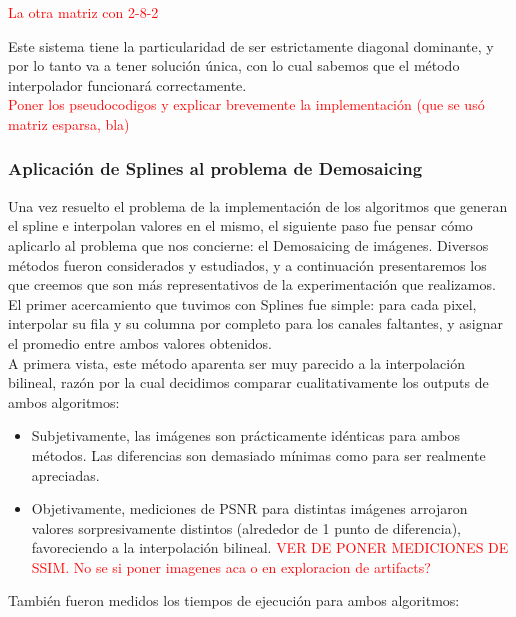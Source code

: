 \documentclass[a4paper]{article}
\begin{document}
\textcolor{red}{La otra matriz con 2-8-2\\}

Este sistema tiene la particularidad de ser estrictamente diagonal dominante, y por lo tanto va a tener solución única, con lo cual sabemos que el método interpolador funcionará correctamente. \\


\textcolor{red}{Poner los pseudocodigos y explicar brevemente la implementación (que se usó matriz esparsa, bla)\\}


\subsubsection*{Aplicación de Splines al problema de Demosaicing}

Una vez resuelto el problema de la implementación de los algoritmos que generan el spline e interpolan valores en el mismo, el siguiente paso fue pensar c\'omo aplicarlo al problema que nos concierne: el Demosaicing de imágenes. Diversos métodos fueron considerados y estudiados, y a continuación presentaremos los que creemos que son más representativos de la experimentación que realizamos. \\

El primer acercamiento que tuvimos con Splines fue simple: para cada pixel, interpolar su fila y su columna por completo para los canales faltantes, y asignar el promedio entre ambos valores obtenidos. \\
A primera vista, este método aparenta ser muy parecido a la interpolación bilineal, razón por la cual decidimos comparar cualitativamente los outputs de ambos algoritmos:
\begin{itemize}
\item Subjetivamente, las imágenes son prácticamente idénticas para ambos métodos. Las diferencias son demasiado mínimas como para ser realmente apreciadas.
\item Objetivamente, mediciones de PSNR para distintas imágenes arrojaron valores sorpresivamente distintos (alrededor de 1 punto de diferencia), favoreciendo a la interpolación bilineal. \textcolor{red}{VER DE PONER MEDICIONES DE SSIM. No se si poner imagenes aca o en exploracion de artifacts?}
\end{itemize}

También fueron medidos los tiempos de ejecución para ambos algoritmos:\\
\end{document}
